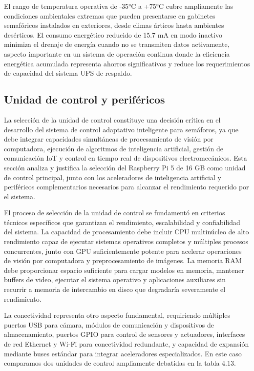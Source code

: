 \documentclass[12pt,a4paper,oneside]{report}
\begin{document}
El rango de temperatura operativa de -35°C a +75°C cubre ampliamente las condiciones ambientales extremas que pueden presentarse en gabinetes semafóricos instalados en exteriores, desde climas árticos hasta ambientes desérticos. El consumo energético reducido de 15.7 mA en modo inactivo minimiza el drenaje de energía cuando no se transmiten datos activamente, aspecto importante en un sistema de operación continua donde la eficiencia energética acumulada representa ahorros significativos y reduce los requerimientos de capacidad del sistema UPS de respaldo.

\subsection{Unidad de control y periféricos}\label{unidad-de-control-y-perifuxe9ricos}

La selección de la unidad de control constituye una decisión crítica en el desarrollo del sistema de control adaptativo inteligente para semáforos, ya que debe integrar capacidades simultáneas de procesamiento de visión por computadora, ejecución de algoritmos de inteligencia artificial, gestión de comunicación IoT y control en tiempo real de dispositivos electromecánicos. Esta sección analiza y justifica la selección del Raspberry Pi 5 de 16 GB como unidad de control principal, junto con los aceleradores de inteligencia artificial y periféricos complementarios necesarios para alcanzar el rendimiento requerido por el sistema.

El proceso de selección de la unidad de control se fundamentó en criterios técnicos específicos que garantizan el rendimiento, escalabilidad y confiabilidad del sistema. La capacidad de procesamiento debe incluir CPU multinúcleo de alto rendimiento capaz de ejecutar sistemas operativos completos y múltiples procesos concurrentes, junto con GPU suficientemente potente para acelerar operaciones de visión por computadora y preprocesamiento de imágenes. La memoria RAM debe proporcionar espacio suficiente para cargar modelos en memoria, mantener buffers de video, ejecutar el sistema operativo y aplicaciones auxiliares sin recurrir a memoria de intercambio en disco que degradaría severamente el rendimiento.

La conectividad representa otro aspecto fundamental, requiriendo múltiples puertos USB para cámara, módulos de comunicación y dispositivos de almacenamiento, puertos GPIO para control de sensores y actuadores, interfaces de red Ethernet y Wi-Fi para conectividad redundante, y capacidad de expansión mediante buses estándar para integrar aceleradores especializados. En este caso comparamos dos unidades de control ampliamente debatidas en la tabla 4.13.
\end{document}
